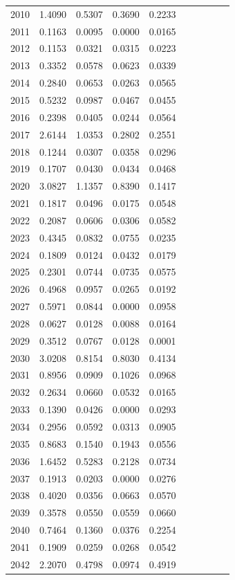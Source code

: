 \begin{table}
\begin{tabular}{cccccccccc}
2010& 1.4090& 0.5307& 0.3690& 0.2233\\ 
2011& 0.1163& 0.0095& 0.0000& 0.0165\\ 
2012& 0.1153& 0.0321& 0.0315& 0.0223\\ 
2013& 0.3352& 0.0578& 0.0623& 0.0339\\ 
2014& 0.2840& 0.0653& 0.0263& 0.0565\\ 
2015& 0.5232& 0.0987& 0.0467& 0.0455\\ 
2016& 0.2398& 0.0405& 0.0244& 0.0564\\ 
2017& 2.6144& 1.0353& 0.2802& 0.2551\\ 
2018& 0.1244& 0.0307& 0.0358& 0.0296\\ 
2019& 0.1707& 0.0430& 0.0434& 0.0468\\ 
2020& 3.0827& 1.1357& 0.8390& 0.1417\\ 
2021& 0.1817& 0.0496& 0.0175& 0.0548\\ 
2022& 0.2087& 0.0606& 0.0306& 0.0582\\ 
2023& 0.4345& 0.0832& 0.0755& 0.0235\\ 
2024& 0.1809& 0.0124& 0.0432& 0.0179\\ 
2025& 0.2301& 0.0744& 0.0735& 0.0575\\ 
2026& 0.4968& 0.0957& 0.0265& 0.0192\\ 
2027& 0.5971& 0.0844& 0.0000& 0.0958\\ 
2028& 0.0627& 0.0128& 0.0088& 0.0164\\ 
2029& 0.3512& 0.0767& 0.0128& 0.0001\\ 
2030& 3.0208& 0.8154& 0.8030& 0.4134\\ 
2031& 0.8956& 0.0909& 0.1026& 0.0968\\ 
2032& 0.2634& 0.0660& 0.0532& 0.0165\\ 
2033& 0.1390& 0.0426& 0.0000& 0.0293\\ 
2034& 0.2956& 0.0592& 0.0313& 0.0905\\ 
2035& 0.8683& 0.1540& 0.1943& 0.0556\\ 
2036& 1.6452& 0.5283& 0.2128& 0.0734\\ 
2037& 0.1913& 0.0203& 0.0000& 0.0276\\ 
2038& 0.4020& 0.0356& 0.0663& 0.0570\\ 
2039& 0.3578& 0.0550& 0.0559& 0.0660\\ 
2040& 0.7464& 0.1360& 0.0376& 0.2254\\ 
2041& 0.1909& 0.0259& 0.0268& 0.0542\\ 
2042& 2.2070& 0.4798& 0.0974& 0.4919\\ 

\end{tabular}
\end{table}
